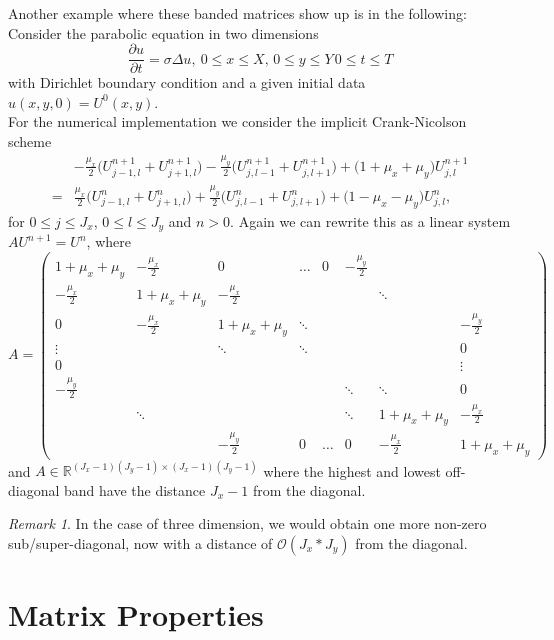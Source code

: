 \documentclass{article}
\numberwithin{pic}{section}
\numberwithin{lem}{section}
\numberwithin{thm}{section}
\numberwithin{cor}{section}
\theoremstyle{definition}
\numberwithin{ex}{section}
\numberwithin{defn}{section}
\theoremstyle{definition}
\theoremstyle{remark}
\newtheorem{rem}{Remark}
\newcommand{\R}{\ensuremath{\mathbb{R}}} %
\begin{document}
Another example where these banded matrices show up is in the following:
Consider the parabolic equation in two dimensions
\[\frac{\partial u}{\partial t}=\sigma \Delta u,~ 0\leq x\leq X,\, 0\leq y\leq Y\, 0\leq t\leq T\]
with Dirichlet boundary condition and a given initial data $u(x,y,0)=U^0(x,y)$.\\
For the numerical implementation we consider the implicit Crank-Nicolson scheme
\begin{align*}
&-\frac{\mu_x}{2}\big(U_{j-1,l}^{n+1}+ U_{j+1,l}^{n+1}\big) -\frac{\mu_y}{2}\big(U_{j,l-1}^{n+1}+U_{j,l+1}^{n+1}\big)+\big(1+\mu_x+\mu_y\big)U_{j,l}^{n+1}\\
=&\frac{\mu_x}{2}\big(U_{j-1,l}^{n}+ U_{j+1,l}^{n}\big) +\frac{\mu_y}{2}\big(U_{j,l-1}^{n}+U_{j,l+1}^{n}\big)+\big(1-\mu_x-\mu_y\big)U_{j,l}^{n},
\end{align*}
for $0\leq j\leq J_x$, $0\leq l\leq J_y$ and $n>0$.
Again we can rewrite this as a linear system $AU^{n+1}=U^n$, where 
\[A=\begin{pmatrix}
1+\mu_x+\mu_y & -\frac{\mu_x}{2} & 0 & \dots & 0 & -\frac{\mu_y}{2} &  &  \\ 
-\frac{\mu_x}{2} & 1+\mu_x+\mu_y & -\frac{\mu_x}{2} &  &  &  & \ddots &  \\ 
0 & -\frac{\mu_x}{2} & 1+\mu_x+\mu_y & \ddots &  &  &  & -\frac{\mu_y}{2} \\ 
\vdots  &  & \ddots & \ddots &  &  &  & 0\\ 
0 &  &  &  &  &  &  & \vdots \\ 
-\frac{\mu_y}{2} &  &  &  &  & \ddots & \ddots & 0 \\ 
 & \ddots &  &  &  & \ddots & 1+\mu_x+\mu_y & -\frac{\mu_x}{2} \\ 
 &  & -\frac{\mu_y}{2} & 0 & \dots & 0 & -\frac{\mu_x}{2} & 1+\mu_x+\mu_y
\end{pmatrix} \]
and $A\in\R^{(J_x-1)(J_y-1)\times (J_x-1)(J_y-1)}$ where the highest and lowest off-diagonal band have the distance $J_x-1$ from the diagonal.
\begin{rem}
In the case of three dimension, we would obtain one more non-zero sub/super-diagonal, now with a distance of $\mathcal{O}(J_x*J_y)$ from the diagonal.
\end{rem}

\section{Matrix Properties}
\end{document}
